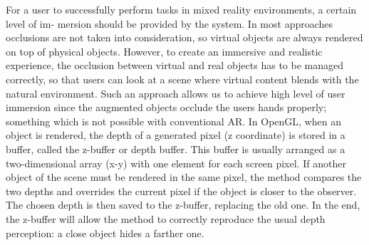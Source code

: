 
For a user to successfully perform tasks in mixed reality environments, a certain level of im- mersion should be provided by the system. In most approaches occlusions are not taken into consideration, so virtual objects are always rendered on top of physical objects. However, to create an immersive and realistic experience, the occlusion between virtual and real objects has to be managed correctly, so that users can look at a scene where virtual content blends with the natural environment. Such an approach allows us to achieve high level of user immersion since the augmented objects occlude the users hands properly; something which is not possible with conventional AR. In OpenGL, when an object is rendered, the depth of a generated pixel (z coordinate) is stored in a buffer, called the z-buffer or depth buffer. This buffer is usually arranged as a two-dimensional array (x-y) with one element for each screen pixel. If another object of the scene must be rendered in the same pixel, the method compares the two depths and overrides the current pixel if the object is closer to the observer. The chosen depth is then saved to the z-buffer, replacing the old one. In the end, the z-buffer will allow the method to correctly reproduce the usual depth perception: a close object hides a farther one.

